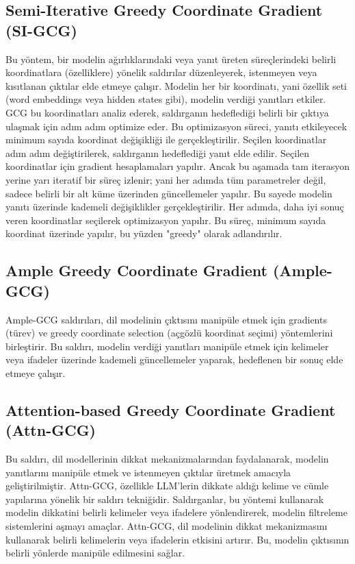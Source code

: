 \newpage

\subsection{Semi-Iterative Greedy Coordinate Gradient (SI-GCG)}

Bu yöntem, bir modelin ağırlıklarındaki veya yanıt üreten süreçlerindeki belirli koordinatlara (özelliklere) yönelik saldırılar düzenleyerek, istenmeyen veya kısıtlanan çıktılar elde etmeye çalışır. Modelin her bir koordinatı, yani özellik seti (word embeddings veya hidden states gibi), modelin verdiği yanıtları etkiler. GCG bu koordinatları analiz ederek, saldırganın hedeflediği belirli bir çıktıya ulaşmak için adım adım optimize eder. Bu optimizasyon süreci, yanıtı etkileyecek minimum sayıda koordinat değişikliği ile gerçekleştirilir. Seçilen koordinatlar adım adım değiştirilerek, saldırganın hedeflediği yanıt elde edilir.  Seçilen koordinatlar için gradient hesaplamaları yapılır. Ancak bu aşamada tam iterasyon yerine yarı iteratif bir süreç izlenir; yani her adımda tüm parametreler değil, sadece belirli bir alt küme üzerinden güncellemeler yapılır. Bu sayede modelin yanıtı üzerinde kademeli değişiklikler gerçekleştirilir. Her adımda, daha iyi sonuç veren koordinatlar seçilerek optimizasyon yapılır. Bu süreç, minimum sayıda koordinat üzerinde yapılır, bu yüzden "greedy" olarak adlandırılır.

\newpage

\subsection{Ample Greedy Coordinate Gradient (Ample-GCG)}

Ample-GCG saldırıları, dil modelinin çıktısını manipüle etmek için gradients (türev) ve greedy coordinate selection (açgözlü koordinat seçimi) yöntemlerini birleştirir. Bu saldırı, modelin verdiği yanıtları manipüle etmek için kelimeler veya ifadeler üzerinde kademeli güncellemeler yaparak, hedeflenen bir sonuç elde etmeye çalışır.

\newpage

\subsection{Attention-based Greedy Coordinate Gradient (Attn-GCG)}

Bu saldırı, dil modellerinin dikkat mekanizmalarından faydalanarak, modelin yanıtlarını manipüle etmek ve istenmeyen çıktılar üretmek amacıyla geliştirilmiştir. Attn-GCG, özellikle LLM'lerin dikkate aldığı kelime ve cümle yapılarına yönelik bir saldırı tekniğidir. Saldırganlar, bu yöntemi kullanarak modelin dikkatini belirli kelimeler veya ifadelere yönlendirerek, modelin filtreleme sistemlerini aşmayı amaçlar. Attn-GCG, dil modelinin dikkat mekanizmasını kullanarak belirli kelimelerin veya ifadelerin etkisini artırır. Bu, modelin çıktısının belirli yönlerde manipüle edilmesini sağlar.


